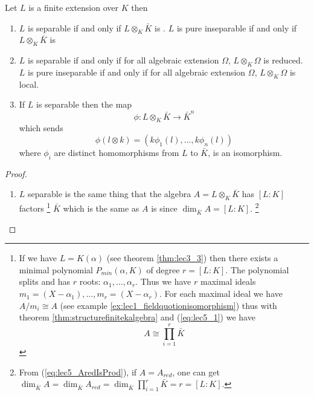 \begin{theorem}
  Let $L$ is a finite extension over $K$ then
  \begin{enumerate}
  \item $L$ is separable if and only if $L \otimes_K \bar{K}$
    is .
    $L$ is pure inseparable if and only if $L \otimes_K \bar{K}$
    is 
  \item $L$ is separable if and only if for all algebraic extension
    $\Omega$, $L \otimes_K \Omega$ is reduced.
    $L$ is pure inseparable if and only if for all algebraic extension
    $\Omega$, $L \otimes_K \Omega$ is local.
  \item If $L$ is separable then the map
    \[
    \phi: L \otimes_K \bar{K} \to \bar{K}^n
    \]
    which sends
    \[
    \phi\left(l \otimes k\right) =
    \left(
    k \phi_1\left(l\right),
    \dots,
    k \phi_n\left(l\right)
    \right)
    \]
    where $\phi_i$ are distinct homomorphisms from $L$ to $\bar{K}$, 
    is an isomorphism.
  \end{enumerate}
  \label{thm:lec5_1}
  \begin{proof}
    \begin{enumerate}
    \item $L$ separable is the same thing that the algebra
      $A = L\otimes_K \bar{K}$ has $\left[L:K\right]$ factors
      \footnote{
        If we have $L = K\left(\alpha\right)$
        (see theorem \ref{thm:lec3_3}) then
        there exists a minimal polynomial $P_{min}\left(\alpha,
        K\right)$ of degree $r = \left[L:K\right]$. The polynomial
        splits and has $r$ roots: $\alpha_1, \dots, \alpha_r$. Thus we
        have $r$ maximal ideals
        \(
        m_1 = \left(X - \alpha_1\right), \dots,
        m_r = \left(X - \alpha_r\right)
        \).
        For each maximal ideal we have $A/m_i \cong A$ (see example
        \ref{ex:lec1_fieldquotionisomorphism}) thus with theorem
        \ref{thm:structurefinitekalgebra} and (\ref{eq:lec5_1}) we have
        \[
        A \cong \prod_{i=1}^r \bar{K}
        \]
      }
      $\bar{K}$ which is the same as $A$ is 
      since $\dim_{\bar{K}} A = \left[L:K\right]$.
      \footnote{
        From (\ref{eq:lec5_AredIsProd}), if $A = A_{red}$, one can get
        $\dim_{\bar{K}} A = \dim_{\bar{K}} A_{red} = \dim_{\bar{K}}
        \prod_{i = 1}^r \bar{K} = r = \left[L:K\right]$.
      }


\end{enumerate}
\end{proof}
\end{theorem}
